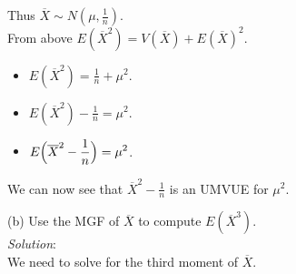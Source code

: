 \documentclass[12pt]{article}
\newcommand{\ds}{\displaystyle}
\begin{document}
Thus $ \ds \overline{X} \sim N(\mu,\frac{1}{n}) $. \\

From above $ \ds E(\overline{X}^{2}) = V(\overline{X}) + E(\overline{X})^{2} $. 

\begin{itemize}
    \item $ \ds E(\overline{X}^{2}) = \frac{1}{n} + \mu^{2} $.
    \item $ \ds E(\overline{X}^{2}) - \frac{1}{n} = \mu^{2} $.
    \item $ \ds E\Bigl( \overline{X}^{2} - \frac{1}{n} \Bigr) = \mu^{2} $.
\end{itemize}

\noindent
We can now see that $ \ds \overline{X}^{2} - \frac{1}{n} $ is an UMVUE for $ \mu^{2} $. \\

\vspace{2.5mm}
\newpage

(b) Use the MGF of $ \overline{X} $ to compute $ E(\overline{X}^{3}) $. 
\vspace{2.5mm} \\
\textit{Solution}:
\vspace{2.5mm} \\

\noindent
We need to solve for the third moment of $ \overline{X} $. \\
\end{document}
